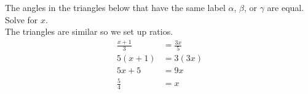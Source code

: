 The angles in the triangles below that have the same label $\alpha$, $\beta$, or $\gamma$ are equal. Solve for $x$.
\[\]
The triangles are similar so we set up ratios.
$$
\begin{align*}
  \frac{x + 1}{3} &= \frac{3x}{5} \\
  5(x+1) &= 3(3x) \\
  5x+5 &= 9x \\
  \frac{5}{4} &= x
\end{align*}
$$
